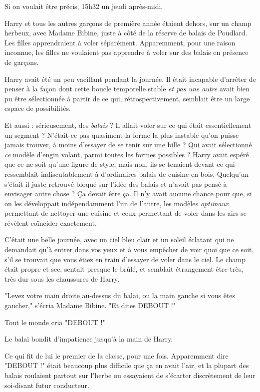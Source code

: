 Si on voulait être précis, 15h32 un jeudi après-midi.

Harry et tous les autres garçons de première année étaient dehors, sur un champ herbeux, avec Madame Bibine, juste à côté de la réserve de balais de Poudlard. Les filles apprendraient à voler séparément. Apparemment, pour une raison inconnue, les filles ne voulaient pas apprendre à voler sur des balais en présence de garçons.

Harry avait été un peu vacillant pendant la journée. Il était incapable d'arrêter de penser à la façon dont cette boucle temporelle stable \emph{et pas une autre } avait bien pu être sélectionnée à partir de ce qui, rétrospectivement, semblait être un large espace de possibilités.

Et aussi : sérieusement, des \emph{balais}  ? Il allait voler sur ce qui était essentiellement un segment ? N'était-ce pas quasiment la forme la plus instable qu'on puisse jamais trouver, à moins d'essayer de se tenir sur une bille ? Qui avait sélectionné \emph{ce}  modèle d'engin volant, parmi toutes les formes possibles ? Harry avait espéré que ce ne soit qu'une figure de style, mais non, ils se tenaient devant ce qui ressemblait indiscutablement à d'ordinaires balais de cuisine en bois. Quelqu'un s'était-il juste retrouvé bloqué sur l'idée des balais et n'avait pas pensé à envisager autre chose ? Ça devait être ça. Il n'y avait aucune chance pour que, si on les développait indépendamment l'un de l'autre, les modèles \emph{optimaux}  permettant de nettoyer une cuisine et ceux permettant de voler dans les airs se révèlent coïncider exactement.

C'était une belle journée, avec un ciel bleu clair et un soleil éclatant qui ne demandait qu'à entrer dans vos yeux et à vous empêcher de voir quoi que ce soit, s'il se trouvait que vous étiez en train d'essayer de voler dans le ciel. Le champ était propre et sec, sentait presque le brûlé, et semblait étrangement être très, très dur sous les chaussures de Harry.

"Levez votre main droite au-dessus du balai, ou la main gauche si vous êtes gaucher," s'écria Madame Bibine. "Et dites DEBOUT !"

Tout le monde cria "DEBOUT !"

Le balai bondit d'impatience jusqu'à la main de Harry.

Ce qui fit de lui le premier de la classe, pour une fois. Apparemment dire "DEBOUT !" était beaucoup plus difficile que ça en avait l'air, et la plupart des balais roulaient partout sur l'herbe ou essayaient de s'écarter discrètement de leur soi-disant futur conducteur.


